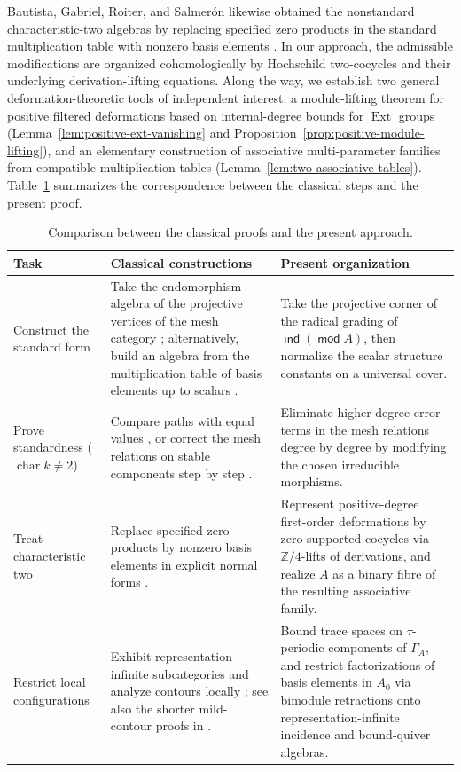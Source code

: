 \documentclass[a4paper,reqno,11pt]{amsart}
\theoremstyle{definition}
\DeclareMathOperator{\modu}{\mathsf{mod}}
\DeclareMathOperator{\ind}{\mathsf{ind}}
\DeclareMathOperator{\Ext}{Ext}
\DeclareMathOperator{\charac}{char}
\newcommand{\Z}{\mathbb Z}
\begin{document}
Bautista, Gabriel, Roiter, and Salmer\'on likewise obtained the
nonstandard characteristic-two algebras by replacing specified zero products
in the standard multiplication table with nonzero basis elements
\cite[Sections~9.2--9.7]{BGRS}. In our approach, the admissible
modifications are organized cohomologically by Hochschild two-cocycles and
their underlying derivation-lifting equations. Along the way, we establish
two general deformation-theoretic tools of independent interest: a module-lifting
theorem for positive filtered deformations based on internal-degree bounds
for $\Ext$ groups (Lemma~\ref{lem:positive-ext-vanishing} and
Proposition~\ref{prop:positive-module-lifting}), and an elementary
construction of associative multi-parameter families from compatible
multiplication tables (Lemma~\ref{lem:two-associative-tables}).
Table~\ref{tab:method-comparison} summarizes the correspondence between the
classical steps and the present proof.

\begin{table}[htbp]
\centering
\small
\renewcommand{\arraystretch}{1.15}
\begin{tabularx}{\textwidth}{@{}>{\raggedright\arraybackslash}p{}
 >{\raggedright\arraybackslash}X >{\raggedright\arraybackslash}X@{}}
\toprule
Task & Classical constructions & Present organization \\
\midrule
Construct the standard form &
Take the endomorphism algebra of the projective vertices of the mesh
category \cite{BretscherGabriel}; alternatively, build an algebra from the
multiplication table of basis elements up to scalars \cite{BGRS}. &
Take the projective corner of the radical grading of $\ind(\modu A)$,
then normalize the scalar structure constants on a universal cover. \\
\addlinespace
Prove standardness ($\charac k\ne2$) &
Compare paths with equal values \cite{BGRS}, or correct the mesh
relations on stable components step by step \cite{Riedtmann1984}. &
Eliminate higher-degree error terms in the mesh relations degree by degree
by modifying the chosen irreducible morphisms. \\
\addlinespace
Treat characteristic two &
Replace specified zero products by nonzero basis elements in explicit normal
forms \cite{BGRS}. &
Represent positive-degree first-order deformations by zero-supported
cocycles via $\Z/4$-lifts of derivations, and realize $A$ as a binary fibre
of the resulting associative family. \\
\addlinespace
Restrict local configurations &
Exhibit representation-infinite subcategories and analyze contours locally
\cite{BGRS}; see also the shorter mild-contour proofs in
\cite{BongartzMild}. &
Bound trace spaces on $\tau$-periodic components of $\Gamma_A$, and restrict
factorizations of basis elements in $A_0$ via bimodule retractions onto
representation-infinite incidence and bound-quiver algebras. \\
\bottomrule
\end{tabularx}
\caption{Comparison between the classical proofs and the present approach.}
\label{tab:method-comparison}
\end{table}
\end{document}
